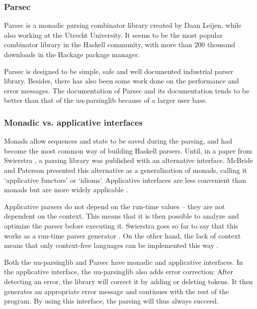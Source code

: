 \subsubsection{Parsec}
%
Parsec is a monadic parsing combinator library created by Daan Leijen, while also working at the Utrecht University.
It seems to be the most popular combinator library in the Haskell community, with more than 200 thousand downloads in the Hackage package manager.

Parsec is designed to be simple, safe and well documented industrial parser library.
Besides, there has also been some work done on the performance and error messages.
The documentation of Parsec and its documentation tends to be better than that of the uu-parsinglib because of a larger user base.


\subsubsection{Monadic vs. applicative interfaces}
Monads allow sequences and state to be saved during the parsing, and had become the most common way of building Haskell parsers.
Until, in a paper from Swierstra , a parsing library was published with an alternative interface.
McBride and Paterson presented this alternative as a generalization of monads, calling it `applicative functors' or `idioms'.
Applicative interfaces are less convenient than monads but are more widely applicable .

Applicative parsers do not depend on the run-time values -- they are not dependent on the context.
This means that it is then possible to analyze and optimize the parser before executing it.
Swierstra goes so far to say that this works as a run-time parser generator .
On the other hand, the lack of context means that only context-free languages can be implemented this way .

Both the uu-parsinglib and Parsec have monadic and applicative interfaces.
In the applicative interface, the uu-parsinglib also adds error correction:
After detecting an error, the library will correct it by adding or deleting tokens.
It then generates an appropriate error message and continues with the rest of the program.
By using this interface, the parsing will thus always succeed.

